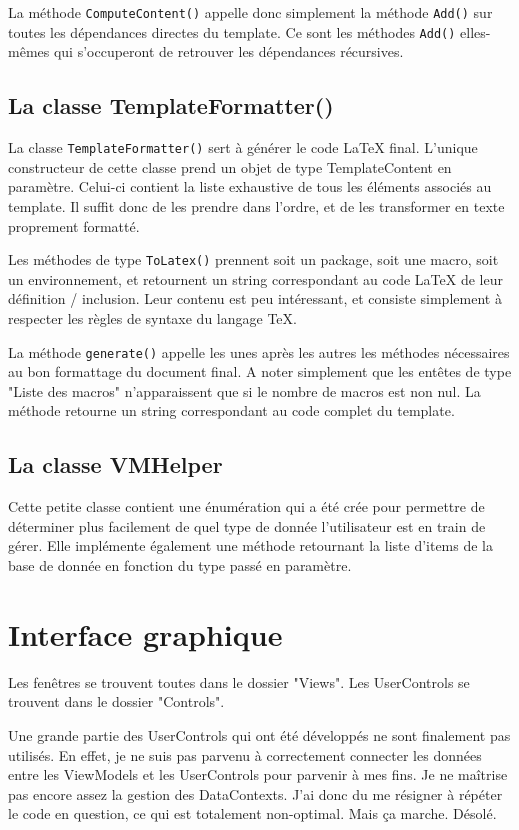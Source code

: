 \documentclass[a4paper, oneside]{article}
\begin{document}
La méthode \texttt{ComputeContent()} appelle donc simplement la méthode
\texttt{Add()} sur toutes les dépendances directes du template. Ce sont les
méthodes \texttt{Add()} elles-mêmes qui s'occuperont de retrouver les
dépendances récursives.
\subsection{La classe TemplateFormatter()}
\label{sec:org16e92bb}
La classe \texttt{TemplateFormatter()} sert à générer le code \LaTeX{}
final. L'unique constructeur de cette classe prend un objet de type
TemplateContent en paramètre. Celui-ci contient la liste exhaustive de
tous les éléments associés au template. Il suffit donc de les prendre
dans l'ordre, et de les transformer en texte proprement formatté.

Les méthodes de type \texttt{ToLatex()} prennent soit un package, soit une
macro, soit un environnement, et retournent un string correspondant au
code \LaTeX{} de leur définition / inclusion. Leur contenu est peu
intéressant, et consiste simplement à respecter les règles de syntaxe
du langage \TeX{}.

La méthode \texttt{generate()} appelle les unes après les autres les méthodes
nécessaires au bon formattage du document final. A noter simplement
que les entêtes de type "Liste des macros" n'apparaissent que si le
nombre de macros est non nul. La méthode retourne un string
correspondant au code complet du template.
\subsection{La classe VMHelper}
\label{sec:org5a0d808}
Cette petite classe  contient une énumération qui a été crée
pour permettre de déterminer plus facilement de quel type de donnée
l'utilisateur est en train de gérer. Elle implémente également une
méthode retournant la liste d'items de la base de donnée en fonction
du type passé en paramètre.
\section{Interface graphique}
\label{sec:org0f55c6e}
Les fenêtres se trouvent toutes dans le dossier "Views". Les
UserControls se trouvent dans le dossier "Controls".

Une grande partie des UserControls qui ont été développés ne sont
finalement pas utilisés. En effet, je ne suis pas parvenu à
correctement connecter les données entre les ViewModels et les
UserControls pour parvenir à mes fins. Je ne maîtrise pas encore assez
la gestion des DataContexts. J'ai donc du me résigner à répéter le
code en question, ce qui est totalement non-optimal. Mais ça
marche. Désolé.
\end{document}
